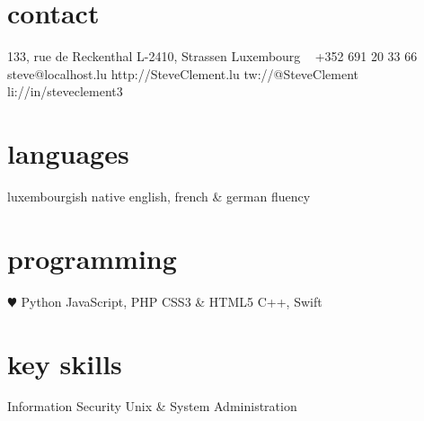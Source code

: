 \documentclass[a4paper]{friggeri-cv} %
\begin{document}


\begin{aside} %
\section{contact}
133, rue de Reckenthal
L-2410, Strassen
Luxembourg
~
+352 691 20 33 66
~
{steve@localhost.lu}
{http://SteveClement.lu}
{tw://@SteveClement}
{li://in/steveclement3}
\section{languages}
luxembourgish native
english, french \& german fluency
\section{programming}
{\color{red} $\varheartsuit$} Python
JavaScript, PHP
CSS3 \& HTML5
C++, Swift
\section{key skills}
Information Security
Unix \& System Administration
\end{aside}

\end{document}
